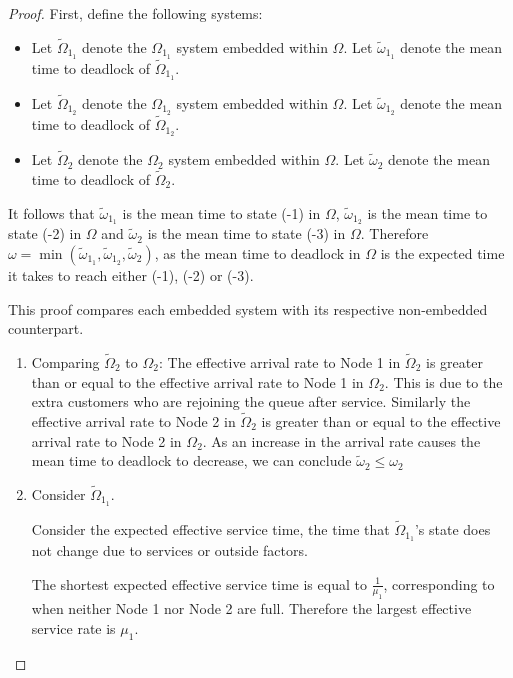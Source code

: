 \documentclass{article}
\begin{document}
\begin{proof}
First, define the following systems:
\begin{itemize}
  \item Let $\widetilde{\Omega}_{1_1}$ denote the $\Omega_{1_1}$ system embedded within $\Omega$. Let $\widetilde{\omega}_{1_1}$ denote the mean time to deadlock of $\widetilde{\Omega}_{1_1}$.
  \item Let $\widetilde{\Omega}_{1_2}$ denote the $\Omega_{1_2}$ system embedded within $\Omega$. Let $\widetilde{\omega}_{1_2}$ denote the mean time to deadlock of $\widetilde{\Omega}_{1_2}$.
  \item Let $\widetilde{\Omega}_2$ denote the $\Omega_2$ system embedded within $\Omega$. Let $\widetilde{\omega}_2$ denote the mean time to deadlock of $\widetilde{\Omega}_2$.
\end{itemize}

It follows that $\widetilde{\omega}_{1_1}$ is the mean time to state (-1) in $\Omega$, $\widetilde{\omega}_{1_2}$ is the mean time to state (-2) in $\Omega$ and $\widetilde{\omega}_2$ is the mean time to state (-3) in $\Omega$.
Therefore $\omega = \min(\widetilde{\omega}_{1_1}, \widetilde{\omega}_{1_2}, \widetilde{\omega}_2)$, as the mean time to deadlock in $\Omega$ is the expected time it takes to reach either (-1), (-2) or (-3).

This proof compares each embedded system with its respective non-embedded counterpart.

\begin{enumerate}

\item Comparing $\widetilde{\Omega}_2$ to $\Omega_2$:
The effective arrival rate to Node 1 in $\widetilde{\Omega}_2$ is greater than or equal to the effective arrival rate to Node 1 in $\Omega_2$.
This is due to the extra customers who are rejoining the queue after service.
Similarly the effective arrival rate to Node 2 in $\widetilde{\Omega}_2$ is greater than or equal to the effective arrival rate to Node 2 in $\Omega_2$.
As an increase in the arrival rate causes the mean time to deadlock to decrease, we can conclude $\widetilde{\omega}_2 \leq \omega_2$

\item Consider $\widetilde{\Omega}_{1_1}$.

Consider the expected effective service time, the time that $\widetilde{\Omega}_{1_1}$'s state does not change due to services or outside factors.

The shortest expected effective service time is equal to $\frac{1}{\mu_1}$, corresponding to when neither Node 1 nor Node 2 are full.
Therefore the largest effective service rate is $\mu_1$.


\end{enumerate}
\end{proof}
\end{document}

